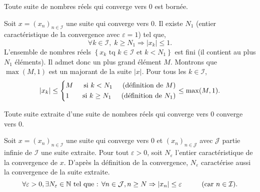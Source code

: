 \begin{propn}\label{convborn0}
Toute suite de nombres réels qui converge vers 0 est bornée.
\end{propn}
\begin{demo}
  Soit $x = (x_n)_{n\in \mathcal I}$ une suite qui converge vers $0$. Il existe $N_1$ (entier caractéristique de la convergence avec $\varepsilon = 1$) tel que,
\begin{displaymath}
  \forall k\in \mathcal{I},\; k\geq N_1 \Rightarrow |x_k| \leq 1 .
\end{displaymath}
L'ensemble de nombres réels $\left\lbrace x_k \text{ tq } k\in \mathcal{I} \text{ et } k < N_1 \right\rbrace$ est fini (il contient au plus $N_1$ éléments). Il admet donc un plus grand élément $M$.\newline
Montrons que $\max(M,1)$ est un majorant de la suite $|x|$. Pour tous les $k\in \mathcal{I}$,
\begin{displaymath}
  |x_k|\leq
\left\lbrace  
\begin{aligned}
  &M &\text{ si } k < N_1 \hspace{0.5cm} \text{(définition de $M$)} \\
  &1 &\text{ si } k \geq N_1 \hspace{0.5cm} \text{(définition de $N_1$)}
\end{aligned}
\right. \leq \max(M,1) .
\end{displaymath}
\end{demo}

\begin{propn} \label{convextr}
Toute suite extraite d'une suite de nombres réels qui converge vers $0$ converge vers $0$.
\end{propn}
\begin{demo}
  Soit $x = (x_n)_{n\in \mathcal I}$ une suite qui converge vers $0$ et $(x_n)_{n\in \mathcal J}$ avec $\mathcal{J}$ partie infinie de $\mathcal{I}$ une suite extraite. Pour tout $\varepsilon>0$, soit $N_{\varepsilon}$ l'entier caractéristique de la convergence de $x$. D'après la définition de la convergence, $N_{\varepsilon}$ caractérise aussi la convergence de la suite extraite.
\begin{displaymath}
 \forall \varepsilon >0 , \exists N_\varepsilon\in \mathbb{N} \text{ tel que : } \forall n\in \mathcal J,  n \geq N \Rightarrow |x_n| \leq \varepsilon 
 \hspace{1cm} \text{(car $n\in \mathcal{I}$)}.
\end{displaymath}
\end{demo}

